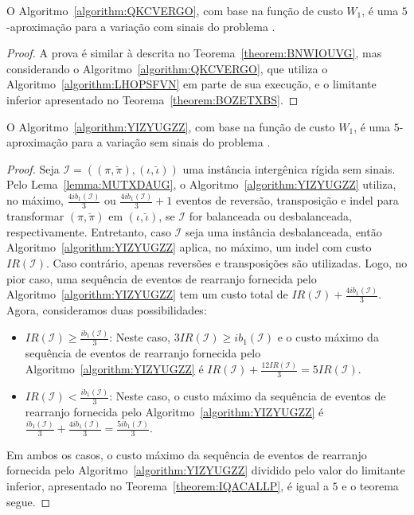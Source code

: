 \begin{theorem}\label{theorem:JKFXFCMF}
O Algoritmo~\ref{algorithm:QKCVERGO}, com base na função de custo $W_1$, é uma $5$-aproximação para a variação com sinais do problema \SbWIRI{}.
\end{theorem}
\begin{proof}
A prova é similar à descrita no Teorema~\ref{theorem:BNWIOUVG}, mas considerando o Algoritmo~\ref{algorithm:QKCVERGO}, que utiliza o Algoritmo~\ref{algorithm:LHOPSFVN} em parte de sua execução, e o limitante inferior apresentado no Teorema~\ref{theorem:BOZETXBS}.
\end{proof}

\begin{theorem}\label{theorem:YATYVCZX}
O Algoritmo~\ref{algorithm:YIZYUGZZ}, com base na função de custo $W_1$, é uma $5$-aproximação para a variação sem sinais do problema \SbWIRTI{}.
\end{theorem}
\begin{proof}
Seja $\mathcal{I} = ((\pi,\breve\pi),(\iota,\breve\iota))$ uma instância intergênica rígida sem sinais. Pelo Lema~\ref{lemma:MUTXDAUG}, o Algoritmo~\ref{algorithm:YIZYUGZZ} utiliza, no máximo, $\frac{4ib_1(\mathcal{I})}{3}$ ou $\frac{4ib_1(\mathcal{I})}{3} + 1$ eventos de reversão, transposição e indel para transformar $(\pi,\breve\pi)$ em $(\iota,\breve\iota)$, se $\mathcal{I}$ for balanceada ou desbalanceada, respectivamente. Entretanto, caso $\mathcal{I}$ seja uma instância desbalanceada, então Algoritmo~\ref{algorithm:YIZYUGZZ} aplica, no máximo, um indel com custo $IR(\mathcal{I})$. Caso contrário, apenas reversões e transposições são utilizadas. Logo, no pior caso, uma sequência de eventos de rearranjo fornecida pelo Algoritmo~\ref{algorithm:YIZYUGZZ} tem um custo total de $IR(\mathcal{I}) + \frac{4ib_1(\mathcal{I})}{3}$. Agora, consideramos duas possibilidades:
\begin{itemize}
  \item $IR(\mathcal{I}) \ge \frac{ib_1(\mathcal{I})}{3}$: Neste caso, $3IR(\mathcal{I}) \ge ib_1(\mathcal{I})$ e o custo máximo da sequência de eventos de rearranjo fornecida pelo Algoritmo~\ref{algorithm:YIZYUGZZ} é $IR(\mathcal{I}) + \frac{12IR(\mathcal{I})}{3} = 5IR(\mathcal{I})$.
  \item $IR(\mathcal{I}) < \frac{ib_1(\mathcal{I})}{3}$: Neste caso, o custo máximo da sequência de eventos de rearranjo fornecida pelo Algoritmo~\ref{algorithm:YIZYUGZZ} é $\frac{ib_1(\mathcal{I})}{3} + \frac{4ib_1(\mathcal{I})}{3} = \frac{5ib_1(\mathcal{I})}{3}$.
\end{itemize}
Em ambos os casos, o custo máximo da sequência de eventos de rearranjo fornecida pelo Algoritmo~\ref{algorithm:YIZYUGZZ} dividido pelo valor do limitante inferior, apresentado no Teorema~\ref{theorem:IQACALLP}, é igual a $5$ e o teorema segue.
\end{proof}

